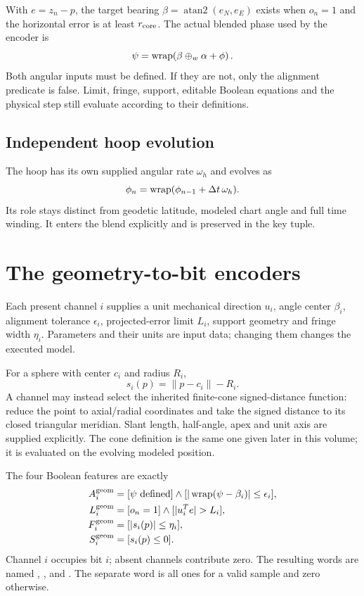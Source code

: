 With $e=z_n-p$, the target bearing $\beta=\operatorname{atan2}(e_N,e_E)$ exists
when $o_n=1$ and the horizontal error is at least $r_{\rm core}$. The actual
blended phase used by the encoder is
\begin{equation}
\psi=\operatorname{wrap}\!\left(\beta\mathbin{\oplus_w}\alpha+\phi\right).
\end{equation}
Both angular inputs must be defined. If they are not, only the alignment
predicate is false. Limit, fringe, support, editable Boolean equations and the
physical step still evaluate according to their definitions.

\subsection{Independent hoop evolution}
The hoop has its own supplied angular rate $\omega_h$ and evolves as
\begin{equation}
\phi_n=\operatorname{wrap}(\phi_{n-1}+\Delta t\,\omega_h).
\end{equation}
Its role stays distinct from geodetic latitude, modeled chart angle and full
time winding. It enters the blend explicitly and is preserved in the key tuple.
\clearpage

\section{The geometry-to-bit encoders}
Each present channel $i$ supplies a unit mechanical direction $u_i$, angle center
$\beta_i$, alignment tolerance $\epsilon_i$, projected-error limit $L_i$,
support geometry and fringe width $\eta_i$. Parameters and their units are input
data; changing them changes the executed model.

For a sphere with center $c_i$ and radius $R_i$,
\begin{equation}
s_i(p)=\|p-c_i\|-R_i.
\end{equation}
A channel may instead select the inherited finite-cone signed-distance function:
reduce the point to axial/radial coordinates and take the signed distance to its
closed triangular meridian. Slant length, half-angle, apex and unit axis are
supplied explicitly. The cone definition is the same one given later in this
volume; it is evaluated on the evolving modeled position.

The four Boolean features are exactly
\begin{align}
A_i^{\rm geom}&=[\psi\ \text{defined}]\land
 [|\wrap(\psi-\beta_i)|\le\epsilon_i],\\
L_i^{\rm geom}&=[o_n=1]\land[|u_i^Te|>L_i],\\
F_i^{\rm geom}&=[|s_i(p)|\le\eta_i],\\
S_i^{\rm geom}&=[s_i(p)\le0].
\end{align}
Channel $i$ occupies bit $i$; absent channels contribute zero. The resulting
words are named , ,  and .
The separate  word is all ones for a valid sample and zero otherwise.

